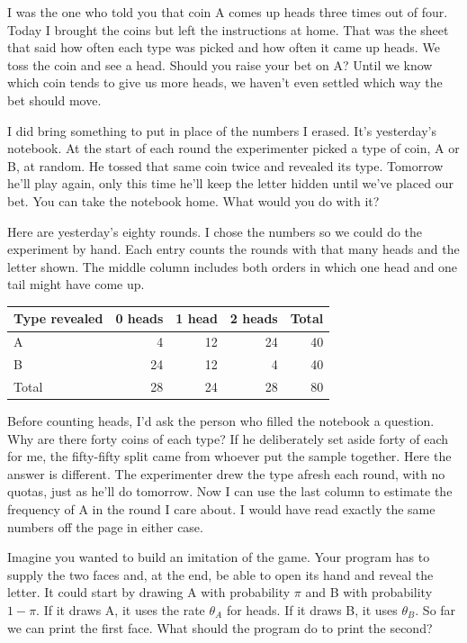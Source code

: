 I was the one who told you that coin A comes up heads three times out of four. Today I brought the coins but left the instructions at home. That was the sheet that said how often each type was picked and how often it came up heads. We toss the coin and see a head. Should you raise your bet on A? Until we know which coin tends to give us more heads, we haven't even settled which way the bet should move.

I did bring something to put in place of the numbers I erased. It's yesterday's notebook. At the start of each round the experimenter picked a type of coin, A or B, at random. He tossed that same coin twice and revealed its type. Tomorrow he'll play again, only this time he'll keep the letter hidden until we've placed our bet. You can take the notebook home. What would you do with it?

Here are yesterday's eighty rounds. I chose the numbers so we could do the experiment by hand. Each entry counts the rounds with that many heads and the letter shown. The middle column includes both orders in which one head and one tail might have come up.
\begin{center}
\begin{tabular}{lrrrr}
\toprule
Type revealed & 0 heads & 1 head & 2 heads & Total \\
\midrule
A & 4 & 12 & 24 & 40 \\
B & 24 & 12 & 4 & 40 \\
\midrule
Total & 28 & 24 & 28 & 80 \\
\bottomrule
\end{tabular}
\end{center}

Before counting heads, I'd ask the person who filled the notebook a question. Why are there forty coins of each type? If he deliberately set aside forty of each for me, the fifty-fifty split came from whoever put the sample together. Here the answer is different. The experimenter drew the type afresh each round, with no quotas, just as he'll do tomorrow. Now I can use the last column to estimate the frequency of A in the round I care about. I would have read exactly the same numbers off the page in either case.

Imagine you wanted to build an imitation of the game. Your program has to supply the two faces and, at the end, be able to open its hand and reveal the letter. It could start by drawing A with probability $\pi$ and B with probability $1-\pi$. If it draws A, it uses the rate $\theta_A$ for heads. If it draws B, it uses $\theta_B$. So far we can print the first face. What should the program do to print the second?

